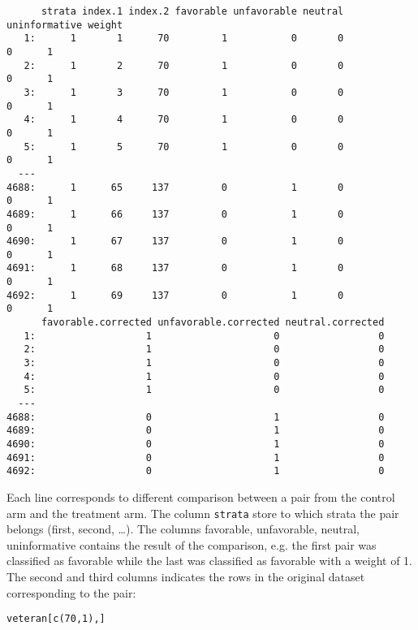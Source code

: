 \documentclass[12pt]{article}
\begin{document}
\begin{verbatim}
      strata index.1 index.2 favorable unfavorable neutral uninformative weight
   1:      1       1      70         1           0       0             0      1
   2:      1       2      70         1           0       0             0      1
   3:      1       3      70         1           0       0             0      1
   4:      1       4      70         1           0       0             0      1
   5:      1       5      70         1           0       0             0      1
  ---                                                                          
4688:      1      65     137         0           1       0             0      1
4689:      1      66     137         0           1       0             0      1
4690:      1      67     137         0           1       0             0      1
4691:      1      68     137         0           1       0             0      1
4692:      1      69     137         0           1       0             0      1
      favorable.corrected unfavorable.corrected neutral.corrected
   1:                   1                     0                 0
   2:                   1                     0                 0
   3:                   1                     0                 0
   4:                   1                     0                 0
   5:                   1                     0                 0
  ---                                                            
4688:                   0                     1                 0
4689:                   0                     1                 0
4690:                   0                     1                 0
4691:                   0                     1                 0
4692:                   0                     1                 0
\end{verbatim}

Each line corresponds to different comparison between a pair from the
control arm and the treatment arm. The column \texttt{strata} store to which
strata the pair belongs (first, second, \ldots{}). The columns favorable,
unfavorable, neutral, uninformative contains the result of the
comparison, e.g. the first pair was classified as favorable while the
last was classified as favorable with a weight of 1. The second and
third columns indicates the rows in the original dataset corresponding
to the pair:
\lstset{language=r,label= ,caption= ,captionpos=b,numbers=none}
\begin{lstlisting}
veteran[c(70,1),]
\end{lstlisting}
\end{document}
